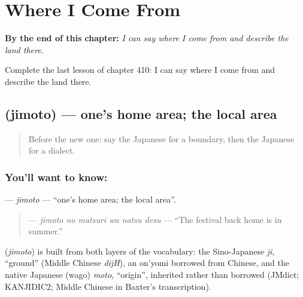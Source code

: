 
\chapter{Where I Come From}
\label{ch:ja-where-i-come-from}

\begin{chapteropening}
\textbf{By the end of this chapter:} \emph{I can say where I come from and describe the land there.}

Complete the last lesson of chapter 410: I can say where I come from and describe the land there.
\end{chapteropening}

\section[\texorpdfstring{\ja{じもと} (jimoto)}{じもと (jimoto)}]{ (jimoto) — one's home area; the local area}

\label{lesson:JA-C410-jimoto}



\begin{quote}
Before the new one: say the Japanese for a boundary, then the Japanese for a dialect.
\end{quote}

\subsection*{You'll want to know: }
\textbf{} — \emph{jimoto} — \textquotedblleft{}one's home area; the local area\textquotedblright{}.

\begin{quote}
\textbf{  } — \emph{jimoto no matsuri wa natsu desu} — \textquotedblleft{}The festival back home is in summer.\textquotedblright{}
\end{quote}

\begin{cousinweb}
\textbf{} (\emph{jimoto}) is built from both layers of the vocabulary: the Sino-Japanese \emph{ji}, \textquotedblleft{}ground\textquotedblright{} (Middle Chinese \emph{dijH}), an on'yomi borrowed from Chinese, and the native Japanese (wago) \emph{moto}, \textquotedblleft{}origin\textquotedblright{}, inherited rather than borrowed (JMdict; KANJIDIC2; Middle Chinese in Baxter's transcription).
\end{cousinweb}

